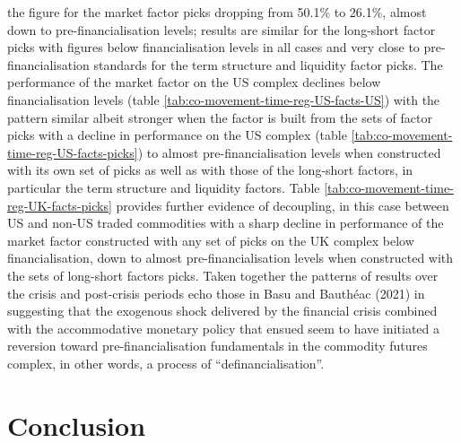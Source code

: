 \documentclass[]{elsarticle} %
\begin{document}
the figure for the market factor picks dropping from 50.1\% to 26.1\%, almost down to pre-financialisation levels; results are similar for the long-short factor picks with figures below financialisation levels in all cases and very close to pre-financialisation standards for the term structure and liquidity factor picks. The performance of the market factor on the US complex declines below financialisation levels (table \ref{tab:co-movement-time-reg-US-facts-US}) with the pattern similar albeit stronger when the factor is built from the sets of factor picks with a decline in performance on the US complex (table \ref{tab:co-movement-time-reg-US-facts-picks}) to almost pre-financialisation levels when constructed with its own set of picks as well as with those of the long-short factors, in particular the term structure and liquidity factors. Table \ref{tab:co-movement-time-reg-UK-facts-picks} provides further evidence of decoupling, in this case between US and non-US traded commodities with a sharp decline in performance of the market factor constructed with any set of picks on the UK complex below financialisation, down to almost pre-financialisation levels when constructed with the sets of long-short factors picks.
Taken together the patterns of results over the crisis and post-crisis periods echo those in Basu and Bauthéac (2021) in suggesting that the exogenous shock delivered by the financial crisis combined with the accommodative monetary policy that ensued seem to have initiated a reversion toward pre-financialisation fundamentals in the commodity futures complex, in other words, a process of ``definancialisation''.

\cleardoublepage

\hypertarget{conclusion}{%
\section{Conclusion}\label{conclusion}}
\end{document}

